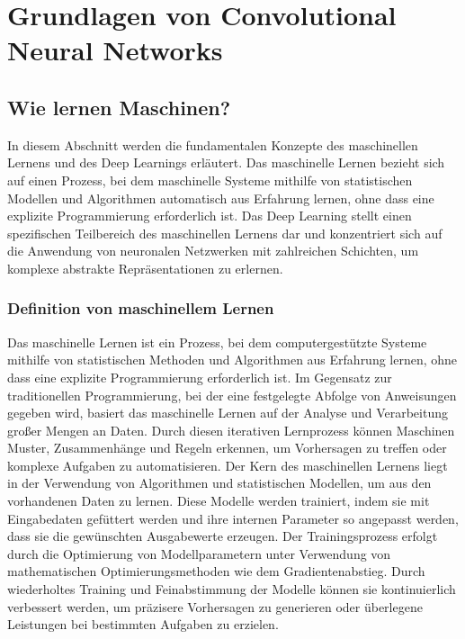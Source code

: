 \chapter{Grundlagen von Convolutional Neural Networks}

\section{Wie lernen Maschinen?}

    In diesem Abschnitt werden die fundamentalen Konzepte des maschinellen Lernens und des Deep Learnings erläutert. 
    Das maschinelle Lernen bezieht sich auf einen Prozess, bei dem maschinelle Systeme mithilfe von statistischen Modellen und Algorithmen automatisch aus Erfahrung lernen, ohne dass eine explizite Programmierung erforderlich ist. 
    Das Deep Learning stellt einen spezifischen Teilbereich des maschinellen Lernens dar und konzentriert sich auf die Anwendung von neuronalen Netzwerken mit zahlreichen Schichten, um komplexe abstrakte Repräsentationen zu erlernen.
    
\subsection{Definition von maschinellem Lernen}
    
    Das maschinelle Lernen ist ein Prozess, bei dem computergestützte Systeme mithilfe von statistischen Methoden und Algorithmen aus Erfahrung lernen, ohne dass eine explizite Programmierung erforderlich ist. 
    Im Gegensatz zur traditionellen Programmierung, bei der eine festgelegte Abfolge von Anweisungen gegeben wird, basiert das maschinelle Lernen auf der Analyse und Verarbeitung großer Mengen an Daten. 
    Durch diesen iterativen Lernprozess können Maschinen Muster, Zusammenhänge und Regeln erkennen, um Vorhersagen zu treffen oder komplexe Aufgaben zu automatisieren.
    Der Kern des maschinellen Lernens liegt in der Verwendung von Algorithmen und statistischen Modellen, um aus den vorhandenen Daten zu lernen. 
    Diese Modelle werden trainiert, indem sie mit Eingabedaten gefüttert werden und ihre internen Parameter so angepasst werden, dass sie die gewünschten Ausgabewerte erzeugen. 
    Der Trainingsprozess erfolgt durch die Optimierung von Modellparametern unter Verwendung von mathematischen Optimierungsmethoden wie dem Gradientenabstieg.
    Durch wiederholtes Training und Feinabstimmung der Modelle können sie kontinuierlich verbessert werden, um präzisere Vorhersagen zu generieren oder überlegene Leistungen bei bestimmten Aufgaben zu erzielen.

